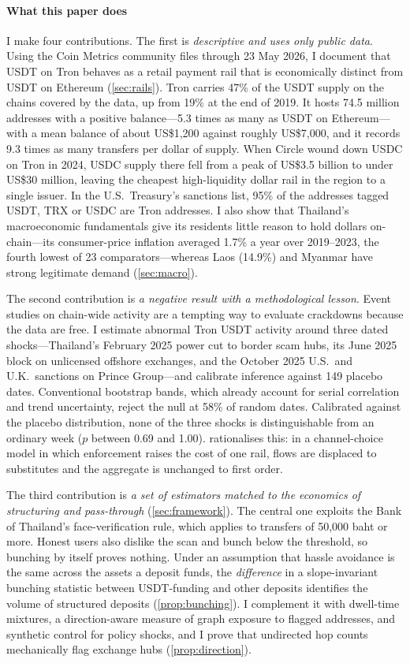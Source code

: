 \paragraph{What this paper does}
I make four contributions. The first is \emph{descriptive and uses only public data}. Using the Coin Metrics community
files through 23 May 2026, I document that USDT on Tron behaves as a retail payment rail that is economically distinct
from USDT on Ethereum (\cref{sec:rails}). Tron carries 47\% of the USDT supply on the chains covered by the data, up
from 19\% at the end of 2019. It hosts 74.5 million addresses with a positive balance---5.3 times as many as USDT on
Ethereum---with a mean balance of about US\$1,200 against roughly US\$7,000, and it records 9.3 times as many transfers
per dollar of supply. When Circle wound down USDC on Tron in 2024, USDC supply there fell from a peak of US\$3.5
billion to under US\$30 million, leaving the cheapest high-liquidity dollar rail in the region to a single issuer. In
the U.S.\ Treasury's sanctions list, 95\% of the addresses tagged USDT, TRX or USDC are Tron addresses. I also show that
Thailand's macroeconomic fundamentals give its residents little reason to hold dollars on-chain---its consumer-price
inflation averaged 1.7\% a year over 2019--2023, the fourth lowest of 23 comparators---whereas Laos (14.9\%) and Myanmar
have strong legitimate demand (\cref{sec:macro}).

The second contribution is \emph{a negative result with a methodological lesson}. Event studies on chain-wide activity
are a tempting way to evaluate crackdowns because the data are free. I estimate abnormal Tron USDT activity around
three dated shocks---Thailand's February 2025 power cut to border scam hubs, its June 2025 block on unlicensed offshore
exchanges, and the October 2025 U.S.\ and U.K.\ sanctions on Prince Group---and calibrate inference against 149 placebo
dates. Conventional bootstrap bands, which already account for serial correlation and trend uncertainty, reject the
null at 58\% of random dates. Calibrated against the placebo distribution, none of the three shocks is distinguishable
from an ordinary week ($p$ between 0.69 and 1.00).  rationalises this: in a channel-choice model
in which enforcement raises the cost of one rail, flows are displaced to substitutes and the aggregate is unchanged to
first order.

The third contribution is \emph{a set of estimators matched to the economics of structuring and pass-through}
(\cref{sec:framework}). The central one exploits the Bank of Thailand's face-verification rule, which applies to
transfers of 50,000 baht or more. Honest users also dislike the scan and bunch below the threshold, so bunching by
itself proves nothing. Under an assumption that hassle avoidance is the same across the assets a deposit funds, the
\emph{difference} in a slope-invariant bunching statistic between USDT-funding and other deposits identifies the volume
of structured deposits (\cref{prop:bunching}). I complement it with dwell-time mixtures, a direction-aware measure of
graph exposure to flagged addresses, and synthetic control for policy shocks, and I prove that undirected hop counts
mechanically flag exchange hubs (\cref{prop:direction}).

